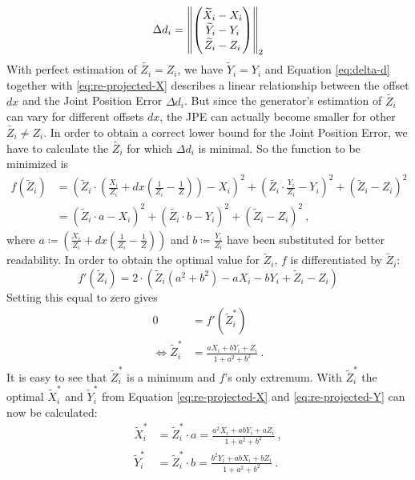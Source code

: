 \begin{equation}
\label{eq:delta-d}
	\Delta d_i = \norm{ 
	\begin{pmatrix}
		\widetilde{X}_i - X_i \\
		\widetilde{Y}_i - Y_i \\
		\widetilde{Z}_i - Z_i
	\end{pmatrix}
	}_2
\end{equation}
With perfect estimation of $\widetilde{Z_i} = Z_i$, we have $\widetilde{Y}_i = Y_i$ and Equation \eqref{eq:delta-d} together with \eqref{eq:re-projected-X} describes a linear relationship between the offset $dx$ and the Joint Position Error $\Delta d_i$.
But since the generator's estimation of $\widetilde{Z_i}$ can vary for different offsets $dx$, the JPE can actually become smaller for other $\widetilde{Z_i} \neq Z_i$. 
In order to obtain a correct lower bound for the Joint Position Error, we have to calculate the $\widetilde{Z_i}$ for which $\Delta d_i$ is minimal.
So the function to be minimized is
\begin{align}
	\label{eq:minimum-distance}
	f(\widetilde{Z}_i) &= \left ( \widetilde{Z}_i \cdot \left( \frac{X_i}{Z_i} + dx \left( \frac{1}{Z_i} - \frac{1}{Z} \right) \right ) - X_i \right)^2 + \left ( \widetilde{Z_i} \cdot \frac{Y_i}{Z_i} - Y_i \right )^2 + \left ( \widetilde{Z}_i - Z_i \right ) ^2 \\
	&= \left ( \widetilde{Z}_i \cdot a - X_i \right)^2 + \left ( \widetilde{Z_i} \cdot b - Y_i \right )^2 + \left ( \widetilde{Z}_i - Z_i \right )^2 \ ,
\end{align}
where $a \coloneqq \left( \frac{X_i}{Z_i} + dx \left( \frac{1}{Z_i} - \frac{1}{Z} \right) \right )$ and $b \coloneqq \frac{Y_i}{Z_i}$ have been substituted for better readability.
In order to obtain the optimal value for $\widetilde{Z}_i$, $f$ is differentiated by $\widetilde{Z}_i$:
\begin{equation}
	\label{eq:derivative-minimum-distance}
	f'(\widetilde{Z}_i) = 2 \cdot \left ( \widetilde{Z}_i \left (a^2 + b^2 \right ) - a X_i - b Y_i + \widetilde{Z}_i - Z_i \right )
\end{equation}
Setting this equal to zero gives
\begin{align}
	0 &= f'(\widetilde{Z}_i^\ast) \\
	\Leftrightarrow \widetilde{Z}_i^\ast & = \frac{a X_i + b Y_i + Z_i}{1 + a^2 + b^2} \ .
	\label{eq:z_i-min}
\end{align}
It is easy to see that $\widetilde{Z}_i^\ast$ is a minimum and $f$'s only extremum.
With $\widetilde{Z}_i^\ast$ the optimal $\widetilde{X}_i^\ast$ and $\widetilde{Y}_i^\ast$ from Equation \eqref{eq:re-projected-X} and \eqref{eq:re-projected-Y} can now be calculated:
\begin{align}
	\label{eq:x_i-min}
	\widetilde{X}_i^\ast &= \widetilde{Z}_i^\ast \cdot a
	= \frac{a^2 X_i + a b Y_i +  a Z_i}{1 + a^2 + b^2} \ ,\\
	\label{eq:y_i-min}
	\widetilde{Y}_i^\ast &= \widetilde{Z}_i^\ast \cdot b
	= \frac{b^2 Y_i + a b X_i + b Z_i}{1 + a^2 + b^2} \ . 
\end{align}

